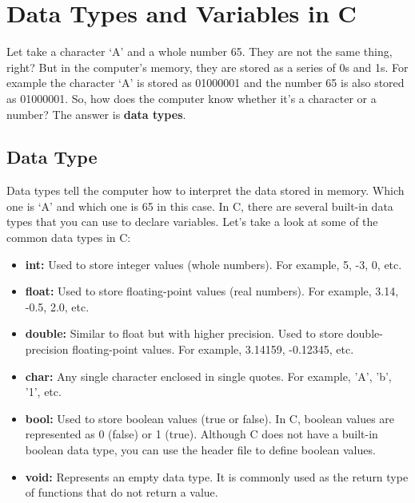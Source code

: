 \documentclass[12pt, openany]{book}
\begin{document}
  
  \clearpage
  
  \chapter{Data Types and Variables in C}
  Let take a character `A' and a whole number 65. They are not the same thing, right? But in the computer's memory, they are stored as a series of 0s and 1s. For example the character `A' is stored as 01000001 and the number 65 is also stored as 01000001. So, how does the computer know whether it's a character or a number? The answer is \textbf{data types}.
  
  \section{Data Type}
  Data types tell the computer how to interpret the data stored in memory. Which one is `A' and which one is 65 in this case. In C, there are several built-in data types that you can use to declare variables. Let's take a look at some of the common data types in C:
  \begin{itemize}
      \item \textbf{int:} Used to store integer values (whole numbers). For example, 5, -3, 0, etc.
      \item \textbf{float:} Used to store floating-point values (real numbers). For example, 3.14, -0.5, 2.0, etc.
      \item \textbf{double:} Similar to float but with higher precision. Used to store double-precision floating-point values. For example, 3.14159, -0.12345, etc.
      \item \textbf{char:} Any single character enclosed in single quotes. For example, 'A', 'b', '1', etc.
      \item \textbf{bool:} Used to store boolean values (true or false). In C, boolean values are represented as 0 (false) or 1 (true). Although C does not have a built-in boolean data type, you can use the  header file to define boolean values.
      \item \textbf{void:} Represents an empty data type. It is commonly used as the return type of functions that do not return a value.
  \end{itemize}
  
\end{document}
